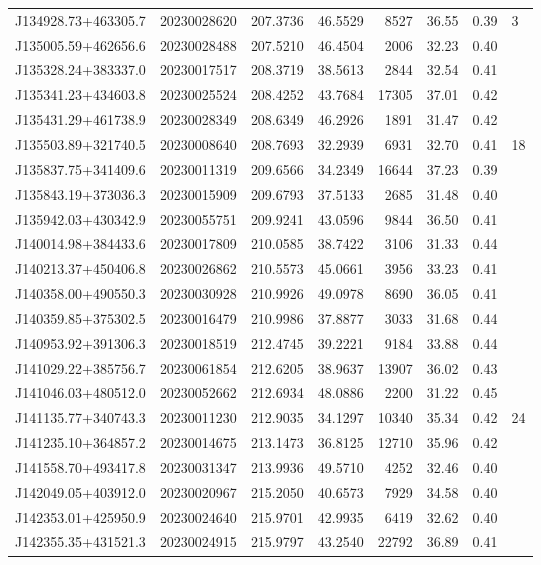 \documentclass{article}
\begin{document}
\begin {longtable}{|l|l|r|r|r|r|r|l|}
 J134928.73+463305.7&  20230028620&  207.3736&   46.5529&  8527& 36.55& 0.39&3\\
 J135005.59+462656.6&  20230028488&  207.5210&   46.4504&  2006& 32.23& 0.40&\\
 J135328.24+383337.0&  20230017517&  208.3719&   38.5613&  2844& 32.54& 0.41&\\
 J135341.23+434603.8&  20230025524&  208.4252&   43.7684& 17305& 37.01& 0.42&\\
 J135431.29+461738.9&  20230028349&  208.6349&   46.2926&  1891& 31.47& 0.42&\\
 J135503.89+321740.5&  20230008640&  208.7693&   32.2939&  6931& 32.70& 0.41&18\\
 J135837.75+341409.6&  20230011319&  209.6566&   34.2349& 16644& 37.23& 0.39&\\
 J135843.19+373036.3&  20230015909&  209.6793&   37.5133&  2685& 31.48& 0.40&\\
 J135942.03+430342.9&  20230055751&  209.9241&   43.0596&  9844& 36.50& 0.41&\\
 J140014.98+384433.6&  20230017809&  210.0585&   38.7422&  3106& 31.33& 0.44&\\
 J140213.37+450406.8&  20230026862&  210.5573&   45.0661&  3956& 33.23& 0.41&\\
 J140358.00+490550.3&  20230030928&  210.9926&   49.0978&  8690& 36.05& 0.41&\\
 J140359.85+375302.5&  20230016479&  210.9986&   37.8877&  3033& 31.68& 0.44&\\
 J140953.92+391306.3&  20230018519&  212.4745&   39.2221&  9184& 33.88& 0.44&\\
 J141029.22+385756.7&  20230061854&  212.6205&   38.9637& 13907& 36.02& 0.43&\\
 J141046.03+480512.0&  20230052662&  212.6934&   48.0886&  2200& 31.22& 0.45&\\
 J141135.77+340743.3&  20230011230&  212.9035&   34.1297& 10340& 35.34& 0.42&24\\
 J141235.10+364857.2&  20230014675&  213.1473&   36.8125& 12710& 35.96& 0.42&\\
 J141558.70+493417.8&  20230031347&  213.9936&   49.5710&  4252& 32.46& 0.40&\\
 J142049.05+403912.0&  20230020967&  215.2050&   40.6573&  7929& 34.58& 0.40&\\
 J142353.01+425950.9&  20230024640&  215.9701&   42.9935&  6419& 32.62& 0.40&\\
 J142355.35+431521.3&  20230024915&  215.9797&   43.2540& 22792& 36.89& 0.41&\\

\end{longtable}
\end{document}
